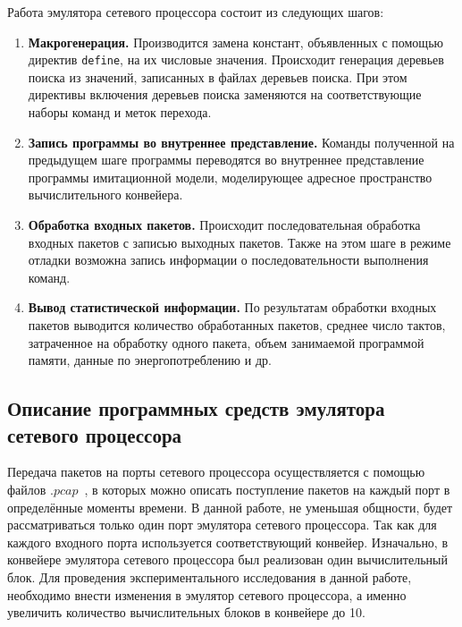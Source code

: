 \documentclass[oneside,final,12pt]{extarticle}
\begin{document}
        Работа эмулятора сетевого процессора состоит из следующих шагов:
        \begin{enumerate}
            \item \textbf{Макрогенерация.} Производится замена констант, объявленных с помощью 
                директив \texttt{define}, на их числовые значения. Происходит генерация 
                деревьев поиска из значений, записанных в файлах деревьев поиска. 
                При этом директивы включения деревьев поиска заменяются на соответствующие наборы 
                команд и меток перехода.
            \item \textbf{Запись программы во внутреннее представление.} Команды полученной на 
                предыдущем шаге программы переводятся во внутреннее представление программы 
                имитационной модели, моделирующее адресное пространство вычислительного конвейера.
            \item \textbf{Обработка входных пакетов.} Происходит последовательная обработка 
                входных пакетов с записью выходных пакетов. Также на этом шаге в режиме отладки 
                возможна запись информации о последовательности выполнения команд.
            \item \textbf{Вывод статистической информации.} По результатам обработки входных 
                пакетов выводится количество обработанных пакетов, среднее число тактов, 
                затраченное на обработку одного пакета, объем занимаемой программой памяти, 
                данные по энергопотреблению и др.
        \end{enumerate}

        \subsection{Описание программных средств эмулятора сетевого процессора}
            Передача пакетов на порты сетевого процессора осуществляется 
            с помощью файлов $.pcap$~\cite{pcap}, в которых можно описать поступление пакетов 
            на каждый порт в определённые моменты времени.
            В данной работе, не уменьшая общности, будет рассматриваться только один порт эмулятора сетевого процессора. Так как для каждого входного
            порта используется соответствующий конвейер. Изначально, в конвейере эмулятора сетевого процессора был реализован один вычислительный блок.
            Для проведения экспериментального исследования в данной работе, необходимо внести изменения в эмулятор сетевого процессора, а именно увеличить количество вычислительных блоков 
            в конвейере до 10.
\end{document}
